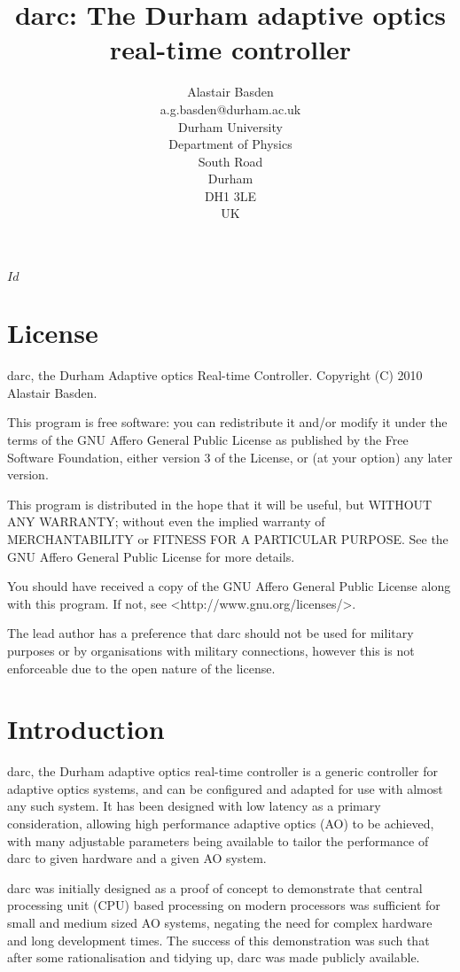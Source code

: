\documentclass[a4,10pt]{article}
\title{darc: The Durham adaptive optics real-time controller}
\author{Alastair Basden \\ a.g.basden@durham.ac.uk \\ Durham University \\ Department of Physics
  \\ South Road \\ Durham \\ DH1 3LE \\ UK}
\providecommand{\gitID}{$Id$}
\newcommand{\ao}{adaptive optics (AO)\renewcommand{\ao}{AO\xspace}\xspace}
\newcommand{\cpu}{central processing unit
  (CPU)\renewcommand{\cpu}{CPU\xspace}\xspace}
\begin{document}
\maketitle
\vfill
\gitID
%

\pagebreak
\tableofcontents
\pagebreak
\section{License}
darc, the Durham Adaptive optics Real-time Controller.
Copyright (C) 2010 Alastair Basden.

This program is free software: you can redistribute it and/or modify
it under the terms of the GNU Affero General Public License as
published by the Free Software Foundation, either version 3 of the
License, or (at your option) any later version.

This program is distributed in the hope that it will be useful,
but WITHOUT ANY WARRANTY; without even the implied warranty of
MERCHANTABILITY or FITNESS FOR A PARTICULAR PURPOSE.  See the
GNU Affero General Public License for more details.

You should have received a copy of the GNU Affero General Public License
along with this program.  If not, see <http://www.gnu.org/licenses/>.

The lead author has a preference that darc should not be used for
military purposes or by organisations with military connections,
however this is not enforceable due to the open nature of the license.

\section{Introduction}
darc, the Durham adaptive optics real-time controller is a generic
controller for adaptive optics systems, and can be configured and
adapted for use with almost any such system.  It has been designed
with low latency as a primary consideration, allowing high performance
\ao to be achieved, with many adjustable parameters being available to
tailor the performance of darc to given hardware and a given \ao
system.

darc was initially designed as a proof of concept to demonstrate that
\cpu based processing on modern processors was sufficient for small
and medium sized \ao systems, negating the need for complex hardware
and long development times.  The success of this demonstration was
such that after some rationalisation and tidying up, darc was made
publicly available.
\end{document}

